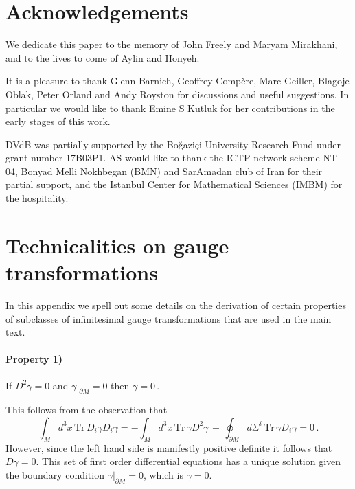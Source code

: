 \documentclass[11pt,a4paper]{article}
\def\Tr{\mathrm{Tr}}
\begin{document}
    
   
   
        

 \section*{Acknowledgements}
 We dedicate this paper to the memory of John Freely and Maryam Mirakhani, and to the lives to come of Aylin and Honyeh.
 
 It is a pleasure to thank Glenn Barnich, Geoffrey Compère,  Marc Geiller, Blagoje Oblak, Peter Orland and Andy Royston for discussions and useful suggestions. In particular we would like to thank Emine S Kutluk for her contributions in the early stages of this work.
 
 DVdB was partially supported by the Bo\u{g}azi\c{c}i University Research Fund under grant number 17B03P1.
 AS would like to thank the ICTP network scheme NT-04, Bonyad Melli Nokhbegan (BMN) and SarAmadan club of Iran for their partial support, and the Istanbul Center for Mathematical Sciences (IMBM) for the hospitality.
    
    \appendix
    \section{Technicalities on gauge transformations}\label{diffeqapp}
     In this appendix we spell out some details on the derivation of certain properties of subclasses of infinitesimal gauge transformations that are used in the main text.
     
    
     \paragraph{Property 1)} If $D^2\gamma=0$ and $\left.\gamma\right|_{\partial M}=0$ then $\gamma=0$\,.
     
     
     This follows from the observation that
     \begin{equation}
     \int_M d^3 x\,\Tr\, D_i \gamma D_i\gamma=-\int_M d^3 x\,\Tr\, \gamma D^2\gamma\,+\,\oint_{\partial M}\!\!d\Sigma^i\, \Tr\, \gamma D_i\gamma=0\,.
     \end{equation}
     However, since the left hand side is manifestly positive definite it follows that $D\gamma=0$. This set of first order differential equations has a unique solution given the boundary condition $\left.\gamma\right|_{\partial M}=0$, which is $\gamma=0$.
     
\end{document}
